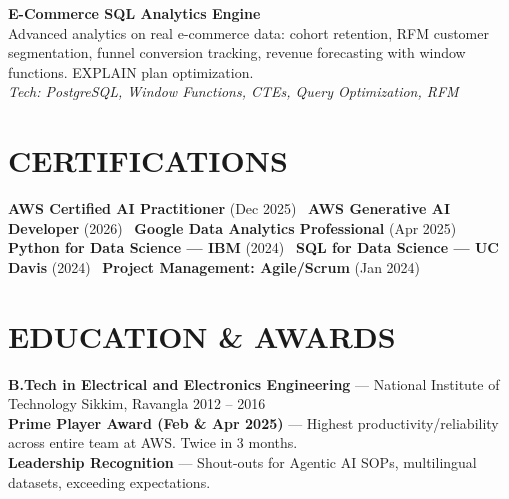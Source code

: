 \documentclass[10.5pt,a4paper]{article}
\begin{document}
\textbf{E-Commerce SQL Analytics Engine}\\
{\small Advanced analytics on real e-commerce data: cohort retention, RFM customer segmentation, funnel conversion tracking, revenue forecasting with window functions. EXPLAIN plan optimization.}\\
{\small\color{subtext}\textit{Tech: PostgreSQL, Window Functions, CTEs, Query Optimization, RFM}}

\section*{CERTIFICATIONS}
{\small
\textbf{AWS Certified AI Practitioner} (Dec 2025) \textbar\ \textbf{AWS Generative AI Developer} (2026) \textbar\ \textbf{Google Data Analytics Professional} (Apr 2025)\\
\textbf{Python for Data Science --- IBM} (2024) \textbar\ \textbf{SQL for Data Science --- UC Davis} (2024) \textbar\ \textbf{Project Management: Agile/Scrum} (Jan 2024)}

\vspace{4pt}
\section*{EDUCATION \& AWARDS}
{\small \textbf{B.Tech in Electrical and Electronics Engineering} --- National Institute of Technology Sikkim, Ravangla \hfill {\color{subtext}2012 -- 2016}}\\[4pt]
{\small \textbf{Prime Player Award (Feb \& Apr 2025)} --- Highest productivity/reliability across entire team at AWS. Twice in 3 months.}\\
{\small \textbf{Leadership Recognition} --- Shout-outs for Agentic AI SOPs, multilingual datasets, exceeding expectations.}
\end{document}

